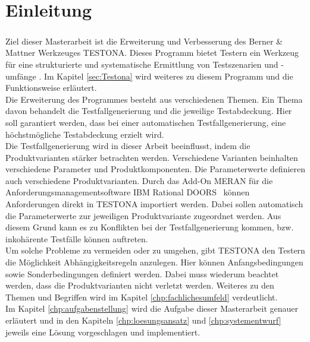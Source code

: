 \chapter{Einleitung}\label{chp:einleitung}
\paragraph{}
Ziel dieser Masterarbeit ist die Erweiterung und Verbesserung des Berner \& Mattner Werkzeuges TESTONA. Dieses Programm bietet Testern ein Werkzeug für eine strukturierte und systematische Ermittlung von Testszenarien und -umfänge \cite{TESTONA}. Im Kapitel \ref{sec:Testona} wird weiteres zu diesem Programm und die Funktionsweise erläutert.\\

Die Erweiterung des Programmes besteht aus verschiedenen Themen. Ein Thema davon behandelt die Testfallgenerierung und die jeweilige Testabdeckung. Hier soll garantiert werden, dass bei einer automatischen Testfallgenerierung, eine höchstmögliche Testabdeckung erzielt wird.\\

Die Testfallgenerierung wird in dieser Arbeit beeinflusst, indem die Produktvarianten stärker betrachten werden. Verschiedene Varianten beinhalten verschiedene Parameter und Produktkomponenten. Die Parameterwerte definieren auch verschiedene Produktvarianten. Durch das Add-On MERAN für die Anforderungsmanagementsoftware \glqq IBM Rational DOORS\grqq~ können Anforderungen direkt in  TESTONA importiert werden. Dabei sollen automatisch die Parameterwerte zur jeweiligen Produktvariante zugeordnet werden. Aus diesem Grund kann es zu Konflikten bei der Testfallgenerierung kommen, bzw. inkohärente Testfälle können auftreten.\\

Um solche Probleme zu vermeiden oder zu umgehen, gibt TESTONA den Testern die Möglichkeit Abhängigkeitsregeln anzulegen. Hier können Anfangsbedingungen sowie Sonderbedingungen definiert werden. Dabei muss wiederum beachtet werden, dass die Produktvarianten nicht verletzt werden. Weiteres zu den Themen und Begriffen wird im Kapitel \ref{chp:fachlichesumfeld} verdeutlicht.\\

Im Kapitel \ref{chp:aufgabenstellung} wird die Aufgabe dieser Masterarbeit genauer erläutert und in den Kapiteln \ref{chp:loesungsansatz} und \ref{chp:systementwurf} jeweils eine Lösung vorgeschlagen und implementiert.

